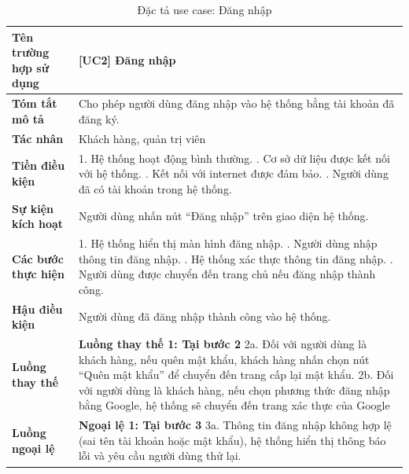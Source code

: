 \begin{longtable}{|>{\bfseries}p{4cm}|p{11.5cm}|}
\caption{Đặc tả use case: Đăng nhập}
\label{tab:uc-login} \\
\hline
\textbf{Tên trường hợp sử dụng} & [UC2] Đăng nhập \\
\hline
\textbf{Tóm tắt mô tả} & Cho phép người dùng đăng nhập vào hệ thống bằng tài khoản đã đăng ký. \\
\hline
\textbf{Tác nhân} & Khách hàng, quản trị viên \\
\hline
\textbf{Tiền điều kiện} & 1. Hệ thống hoạt động bình thường. \newline
2. Cơ sở dữ liệu được kết nối với hệ thống. \newline
3. Kết nối với internet được đảm bảo. \newline
4. Người dùng đã có tài khoản trong hệ thống.\\
\hline
\textbf{Sự kiện kích hoạt} & Người dùng nhấn nút “Đăng nhập” trên giao diện hệ thống. \\
\hline
\textbf{Các bước thực hiện} & 1. Hệ thống hiển thị màn hình đăng nhập. \newline
2. Người dùng nhập thông tin đăng nhập. \newline
3. Hệ thống xác thực thông tin đăng nhập. \newline
4. Người dùng được chuyển đến trang chủ nếu đăng nhập thành công. \\
\hline
\textbf{Hậu điều kiện} & Người dùng đã đăng nhập thành công vào hệ thống. \\
\hline
\textbf{Luồng thay thế} & \textbf{Luồng thay thế 1: Tại bước 2} \newline
2a. Đối với người dùng là khách hàng, nếu quên mật khẩu, khách hàng nhấn chọn nút “Quên mật khẩu” để chuyển đến trang cấp lại mật khẩu. \newline
2b. Đối với người dùng là khách hàng, nếu chọn phương thức đăng nhập bằng Google, hệ thống sẽ chuyển đến trang xác thực của Google\\
\hline
\textbf{Luồng ngoại lệ} & \textbf{Ngoại lệ 1: Tại bước 3} \newline
3a. Thông tin đăng nhập không hợp lệ (sai tên tài khoản hoặc mật khẩu), hệ thống hiển thị thông báo lỗi và yêu cầu người dùng thử lại. \\
\hline
\end{longtable}

